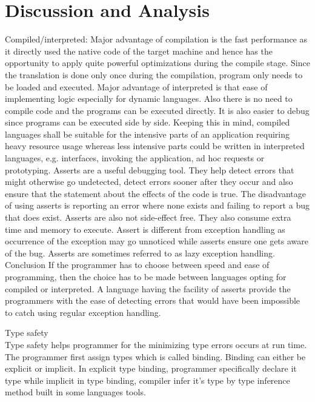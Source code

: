 \documentclass{sig-alternate}
\begin{document}
	
	\section{Discussion and Analysis}
	Compiled/interpreted: Major advantage of compilation is the fast performance as it directly used the native code of the target machine and hence has the opportunity to apply quite powerful optimizations during the compile stage. Since the translation is done only once during the compilation, program only needs to be loaded and executed. Major advantage of interpreted is that ease of implementing logic especially for dynamic languages. Also there is no need to compile code and the programs can be executed directly. It is also easier to debug since programs can be executed side by side. Keeping this in mind, compiled languages shall be suitable for the intensive parts of an application requiring heavy resource usage whereas less intensive parts could be written in interpreted languages, e.g. interfaces, invoking the application, ad hoc requests or prototyping.
	Asserts are a useful debugging tool. They help detect errors that might otherwise go undetected, detect errors sooner after they occur and also ensure that the statement about the effects of the code is true. The disadvantage of using asserts is reporting an error where none exists and failing to report a bug that does exist. Asserts are also not side-effect free. They also consume extra time and memory to execute. Assert is different from exception handling as occurrence of the exception may go unnoticed while asserts ensure one gets aware of the bug. Asserts are sometimes referred to as lazy exception handling.
	Conclusion
	If the programmer has to choose between speed and ease of programming, then the choice has to be made between languages opting for compiled or interpreted. A language having the facility of asserts provide the programmers with the ease of detecting errors that would have been impossible to catch using regular exception handling.
	
	Type safety \\ 
	
	Type safety helps programmer for the minimizing type errors occurs at run time. The programmer first assign types which is called binding. Binding can either be explicit or implicit. In explicit type binding, programmer specifically declare it type while implicit in type binding, compiler infer it's type by type inference method built in some languages tools.\\
	
\end{document}
